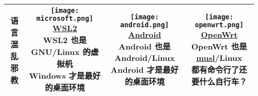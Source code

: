 \documentclass{standalone}
\begin{document}
\begin{tabular}{|c|c|c|c|}
  \\\hline
  \makecell{\textbf{语言混乱}                                \\邪教} &
  \makecell{\texttt{[image: microsoft.png]}   \\\href{https://learn.microsoft.com/en-us/windows/wsl/about}{WSL2}\\WSL2 也是 GNU/Linux \sout{的虚拟机}\\Windows 才是最好的桌面环境} &
  \makecell{\texttt{[image: android.png]}     \\\href{https://www.android.com/}{Android}\\Android 也是 Android/Linux\\Android 才是最好的桌面环境} &
  \makecell{\texttt{[image: openwrt.png]}     \\\href{https://openwrt.org/}{OpenWrt}\\OpenWrt 也是 \href{https://www.musl-libc.org/}{musl}/Linux\\都有命令行了还要什么自行车？}
  \\\hline
\end{tabular}
\end{document}
